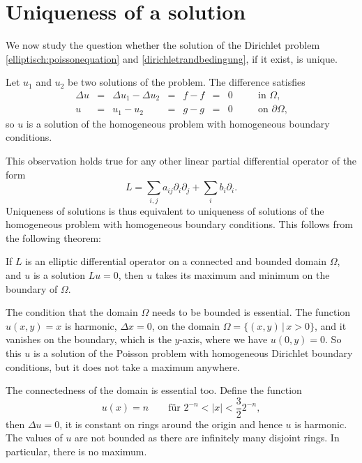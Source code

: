 %
%
%
\section{Uniqueness of a solution}
We now study the question whether the solution of the Dirichlet problem
\eqref{elliptisch:poissonequation} and \eqref{dirichletrandbedingung},
if it exist, is unique.

Let $u_1$ and $u_2$ be two solutions of the problem.
The difference satisfies
\[
\renewcommand{\arraycolsep}{2.5pt}
\begin{array}{rclclclcl}
\Delta u &=& \Delta u_1-\Delta u_2 &=& f-f &=& 0 &\quad&\text{in $\Omega$,}\\
u        &=& u_1-u_2               &=& g-g &=& 0 &     &\text{on $\partial\Omega$,}
\end{array}
\]
so $u$ is a solution of the homogeneous problem with homogeneous 
boundary conditions.

This observation holds true for any other linear partial differential
operator of the form
\[
L=\sum_{i,j}a_{ij}\partial_i\partial_j+\sum_i b_i\partial_i.
\]
Uniqueness of solutions is thus equivalent to uniqueness of solutions
of the homogeneous problem with homogeneous boundary conditions.
This follows from the following theorem:

\begin{satz}
\label{maximumprinzip}
If $L$ is an elliptic differential operator on a connected and
bounded domain $\Omega$, and $u$ is a solution $Lu=0$, then $u$ takes
its maximum and minimum on the boundary of $\Omega$.
\end{satz}

The condition that the domain $\Omega$ needs to be bounded is essential.
The function $u(x,y)=x$ is harmonic, $\Delta x=0$, on the domain
$\Omega=\{(x,y)\,|\,x>0\}$, and it vanishes on the boundary, which is
the $y$-axis, where we have $u(0,y)=0$.
So this $u$ is a solution of the Poisson problem with homogeneous
Dirichlet boundary conditions,
but it does not take a maximum anywhere.

The connectedness of the domain is essential too.
Define the function
\[
u(x)=n\qquad\text{für $2^{-n} < |x| < \frac{3}{2}2^{-n}$},
\]
then $\Delta u=0$, it is constant on rings around the origin and hence
$u$ is harmonic.
The values of $u$ are not bounded as there are infinitely many disjoint
rings.
In particular, there is no maximum.

